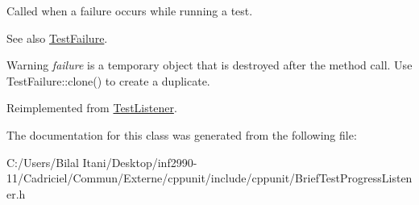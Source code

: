 Called when a failure occurs while running a test. 

\begin{DoxySeeAlso}{See also}
\hyperlink{class_test_failure}{Test\+Failure}. 
\end{DoxySeeAlso}
\begin{DoxyWarning}{Warning}
{\itshape failure} is a temporary object that is destroyed after the method call. Use Test\+Failure\+::clone() to create a duplicate. 
\end{DoxyWarning}


Reimplemented from \hyperlink{class_test_listener_a103216a5814c907f7b752b969477e765}{Test\+Listener}.



The documentation for this class was generated from the following file\+:\begin{DoxyCompactItemize}
\item 
C\+:/\+Users/\+Bilal Itani/\+Desktop/inf2990-\/11/\+Cadriciel/\+Commun/\+Externe/cppunit/include/cppunit/Brief\+Test\+Progress\+Listener.\+h\end{DoxyCompactItemize}
